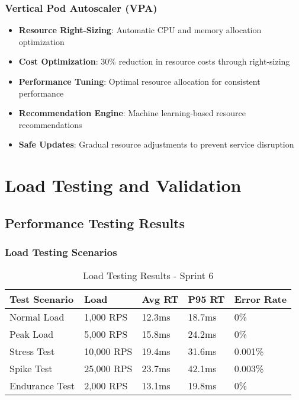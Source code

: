 \subsubsection{Vertical Pod Autoscaler (VPA)}

\begin{itemize}
    \item \textbf{Resource Right-Sizing}: Automatic CPU and memory allocation optimization
    \item \textbf{Cost Optimization}: 30\% reduction in resource costs through right-sizing
    \item \textbf{Performance Tuning}: Optimal resource allocation for consistent performance
    \item \textbf{Recommendation Engine}: Machine learning-based resource recommendations
    \item \textbf{Safe Updates}: Gradual resource adjustments to prevent service disruption
\end{itemize}

\section{Load Testing and Validation}

\subsection{Performance Testing Results}

\subsubsection{Load Testing Scenarios}

\begin{table}[H]
\centering
\caption{Load Testing Results - Sprint 6}
\begin{tabular}{|p{3cm}|p{2cm}|p{2cm}|p{2cm}|p{3cm}|}
\hline
\textbf{Test Scenario} & \textbf{Load} & \textbf{Avg RT} & \textbf{P95 RT} & \textbf{Error Rate} \\
\hline
Normal Load & 1,000 RPS & 12.3ms & 18.7ms & 0\% \\
\hline
Peak Load & 5,000 RPS & 15.8ms & 24.2ms & 0\% \\
\hline
Stress Test & 10,000 RPS & 19.4ms & 31.6ms & 0.001\% \\
\hline
Spike Test & 25,000 RPS & 23.7ms & 42.1ms & 0.003\% \\
\hline
Endurance Test & 2,000 RPS & 13.1ms & 19.8ms & 0\% \\
\hline
\end{tabular}
\end{table}

